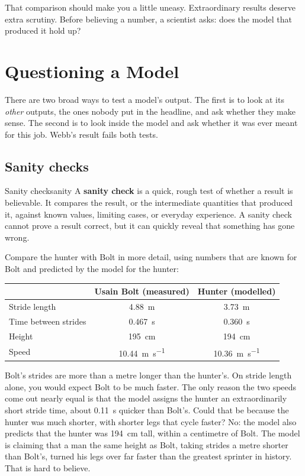 \documentclass[11pt,twoside,openany]{book}
\newcounter{check}[chapter]
\begin{document}
That comparison should make you a little uneasy. Extraordinary results deserve extra scrutiny. Before believing a number, a scientist asks: does the model that produced it hold up?

\section{Questioning a Model}
\label{sec:questioning}

There are two broad ways to test a model's output. The first is to look at its \emph{other} outputs, the ones nobody put in the headline, and ask whether they make sense. The second is to look inside the model and ask whether it was ever meant for this job. Webb's result fails both tests.

\subsection{Sanity checks}

\begin{definition}{Sanity check}{sanity}
A \textbf{sanity check} is a quick, rough test of whether a result is believable. It compares the result, or the intermediate quantities that produced it, against known values, limiting cases, or everyday experience. A sanity check cannot prove a result correct, but it can quickly reveal that something has gone wrong.
\end{definition}

Compare the hunter with Bolt in more detail, using numbers that are known for Bolt and predicted by the model for the hunter:

\begin{center}
\begin{tabular}{lcc}
\toprule
 & Usain Bolt (measured) & Hunter (modelled) \\
\midrule
Stride length & \SI{4.88}{\metre} & \SI{3.73}{\metre} \\
Time between strides & \SI{0.467}{\second} & \SI{0.360}{\second} \\
Height & \SI{195}{\centi\metre} & \SI{194}{\centi\metre} \\
Speed & \SI{10.44}{\metre\per\second} & \SI{10.36}{\metre\per\second} \\
\bottomrule
\end{tabular}
\end{center}

Bolt's strides are more than a metre longer than the hunter's. On stride length alone, you would expect Bolt to be much faster. The only reason the two speeds come out nearly equal is that the model assigns the hunter an extraordinarily short stride time, about \SI{0.11}{\second} quicker than Bolt's. Could that be because the hunter was much shorter, with shorter legs that cycle faster? No: the model also predicts that the hunter was \SI{194}{\centi\metre} tall, within a centimetre of Bolt. The model is claiming that a man the same height as Bolt, taking strides a metre shorter than Bolt's, turned his legs over far faster than the greatest sprinter in history. That is hard to believe.
\end{document}
